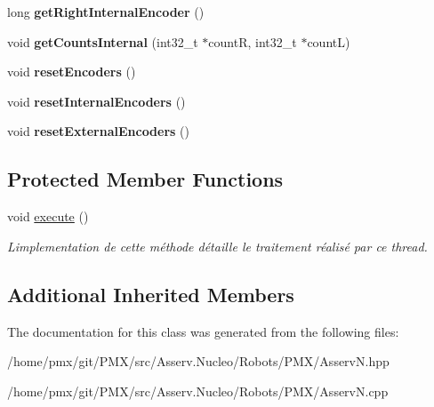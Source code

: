 \begin{DoxyCompactItemize}
long {\bfseries get\+Right\+Internal\+Encoder} ()
\item 
\mbox{\label{classAsservN_aae30fa08c6c20d98fc201b06e9efa417}} 
void {\bfseries get\+Counts\+Internal} (int32\+\_\+t $\ast$countR, int32\+\_\+t $\ast$countL)
\item 
\mbox{\label{classAsservN_a62afa465750657f93df927e31c3ac1d6}} 
void {\bfseries reset\+Encoders} ()
\item 
\mbox{\label{classAsservN_a8c09510937dcf3be4bd204b9b0aff1e7}} 
void {\bfseries reset\+Internal\+Encoders} ()
\item 
\mbox{\label{classAsservN_abfe384bec9f33d695a914f1b3b70b02c}} 
void {\bfseries reset\+External\+Encoders} ()
\end{DoxyCompactItemize}
\subsection*{Protected Member Functions}
\begin{DoxyCompactItemize}
\item 
\mbox{\label{classAsservN_a85a855eb1b0803d016ff97a286a95eba}} 
void \hyperlink{classAsservN_a85a855eb1b0803d016ff97a286a95eba}{execute} ()
\begin{DoxyCompactList}\small\item\em L\textquotesingle{}implementation de cette méthode détaille le traitement réalisé par ce thread. \end{DoxyCompactList}\end{DoxyCompactItemize}
\subsection*{Additional Inherited Members}


The documentation for this class was generated from the following files\+:\begin{DoxyCompactItemize}
\item 
/home/pmx/git/\+P\+M\+X/src/\+Asserv.\+Nucleo/\+Robots/\+P\+M\+X/Asserv\+N.\+hpp\item 
/home/pmx/git/\+P\+M\+X/src/\+Asserv.\+Nucleo/\+Robots/\+P\+M\+X/Asserv\+N.\+cpp\end{DoxyCompactItemize}
